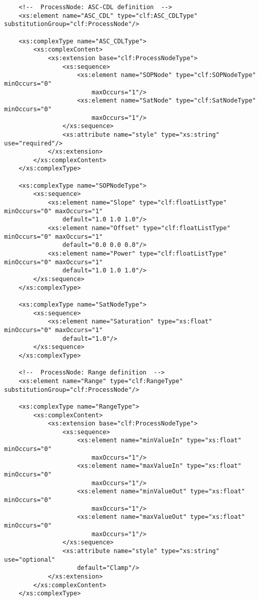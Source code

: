 \begin{lstlisting}
    <!--  ProcessNode: ASC-CDL definition  -->
    <xs:element name="ASC_CDL" type="clf:ASC_CDLType" substitutionGroup="clf:ProcessNode"/>
    
    <xs:complexType name="ASC_CDLType">
        <xs:complexContent>
            <xs:extension base="clf:ProcessNodeType">
                <xs:sequence>
                    <xs:element name="SOPNode" type="clf:SOPNodeType" minOccurs="0" 
                        maxOccurs="1"/>
                    <xs:element name="SatNode" type="clf:SatNodeType" minOccurs="0" 
                        maxOccurs="1"/>
                </xs:sequence>                
                <xs:attribute name="style" type="xs:string" use="required"/>
            </xs:extension>
        </xs:complexContent>        
    </xs:complexType>
    
    <xs:complexType name="SOPNodeType">
        <xs:sequence>
            <xs:element name="Slope" type="clf:floatListType" minOccurs="0" maxOccurs="1" 
                default="1.0 1.0 1.0"/>
            <xs:element name="Offset" type="clf:floatListType" minOccurs="0" maxOccurs="1" 
                default="0.0 0.0 0.0"/>
            <xs:element name="Power" type="clf:floatListType" minOccurs="0" maxOccurs="1" 
                default="1.0 1.0 1.0"/>
        </xs:sequence>
    </xs:complexType>

    <xs:complexType name="SatNodeType">
        <xs:sequence>
            <xs:element name="Saturation" type="xs:float" minOccurs="0" maxOccurs="1" 
                default="1.0"/>
        </xs:sequence>
    </xs:complexType>
    
    <!--  ProcessNode: Range definition  -->
    <xs:element name="Range" type="clf:RangeType" substitutionGroup="clf:ProcessNode"/>
    
    <xs:complexType name="RangeType">
        <xs:complexContent>
            <xs:extension base="clf:ProcessNodeType">
                <xs:sequence>
                    <xs:element name="minValueIn" type="xs:float" minOccurs="0" 
                        maxOccurs="1"/>
                    <xs:element name="maxValueIn" type="xs:float" minOccurs="0" 
                        maxOccurs="1"/>
                    <xs:element name="minValueOut" type="xs:float" minOccurs="0"
                        maxOccurs="1"/>
                    <xs:element name="maxValueOut" type="xs:float" minOccurs="0"
                        maxOccurs="1"/>
                </xs:sequence>
                <xs:attribute name="style" type="xs:string" use="optional" 
                    default="Clamp"/>
            </xs:extension>
        </xs:complexContent>
    </xs:complexType>
    

\end{lstlisting}
